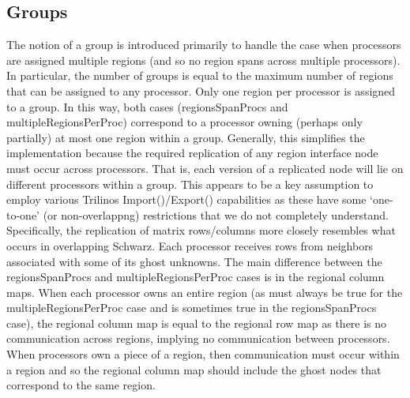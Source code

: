 \documentclass[11pt]{article}
\begin{document}
\subsection{Groups}
The notion of a group is introduced primarily to handle the case when
processors are assigned multiple regions (and so no region spans
across multiple processors). In particular, the number of groups is
equal to the maximum number of regions that can be assigned to
any processor. Only one region per processor is assigned to a group.
In this way, both cases ({\sf regionsSpanProcs} and
{\sf multipleRegionsPerProc}) correspond to a processor owning (perhaps only
partially) at most one region within a group.
Generally, this simplifies the implementation because the required
replication of any region interface node must occur across processors.
That is, each version of a replicated node will lie on different
processors within a group. This appears to be a key assumption to employ various
Trilinos Import()/Export() capabilities as these have
some `one-to-one' (or non-overlappng) restrictions that we
do not completely understand.
Specifically, the replication of matrix rows/columns more closely
resembles what occurs in overlapping Schwarz. Each processor
receives rows from neighbors associated with some of its ghost
unknowns. The main difference between the {\sf regionsSpanProcs} and
{\sf multipleRegionsPerProc} cases is in the regional column maps.
When each processor owns an entire region (as must always
be true for the {\sf multipleRegionsPerProc} case and is sometimes
true in the {\sf regionsSpanProcs} case), the regional column map is equal
to the regional row map as there is no communication across regions, implying
no communication between processors. When processors own a piece of
a region, then communication must occur within a region and so
the regional column map should include the ghost nodes that correspond
to the same region.
\end{document}
